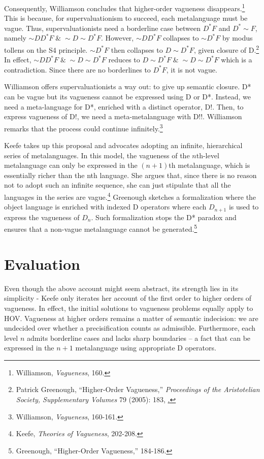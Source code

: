 Consequently, Williamson concludes that higher-order vagueness
disappears.\footnote{Williamson, \emph{Vagueness}, 160.} This is
because, for supervaluationism to succeed, each metalanguage must be
vague. Thus, supervaluationists need a borderline case between
$D^{*}F$ and $D^{*}{\sim}F$, namely
${{\sim}DD}^{*}F \; \& \; {\sim}D{\sim}D^{*}F$. However, ${{\sim}DD}^{*}F$
collapses to ${{\sim}D}^{*}F$ by modus tollens on the S4 principle. ${{\sim}D}^{*}F$ then collapses to ${D\sim D}^{*}F$, given closure of
D.\footnote{Patrick Greenough, ``Higher-Order Vagueness,''
  \emph{Proceedings of the Aristotelian Society, Supplementary Volumes}
  79 (2005): 183,
  \href{http://www.jstor.org/stable/4106939}.}
In effect, ${{\sim}DD}^{*}F \; \& \; {\sim}D{\sim}D^{*}F$ reduces to ${D{\sim}D}^{*}F \; \& \; {\sim}D{\sim}D^{*}F$ which is a contradiction.
Since there are no borderlines to $D^{*}F$, it is not vague.

Williamson offers supervaluationists a way out: to give up semantic
closure. D* can be vague but its vagueness cannot be expressed using D
or D*. Instead, we need a meta-language for D*, enriched with a distinct
operator, D!. Then, to express vagueness of D!, we need a
meta-metalanguage with D!!. Williamson remarks that the process could
continue infinitely.\footnote{Williamson, \emph{Vagueness}, 160-161.}

Keefe takes up this proposal and advocates adopting an infinite,
hierarchical series of metalanguages. In this model, the vagueness of
the $n$th-level metalanguage can only be expressed in the $(n+1)$th
metalanguage, which is essentially richer than the nth language. She
argues that, since there is no reason not to adopt such an infinite
sequence, she can just stipulate that all the languages in the series
are vague.\footnote{Keefe, \emph{Theories of Vagueness}, 202-208.}
Greenough sketches a formalization where the object language is enriched
with indexed D operators where each \(D_{n + 1}\) is used to express the
vagueness of \(D_{n}\). Such formalization stops the D* paradox and
ensures that a non-vague metalanguage cannot be generated.\footnote{Greenough,
  ``Higher-Order Vagueness,'' 184-186.}

\section{Evaluation}

Even though the above account might seem abstract, its strength lies in
its simplicity - Keefe only iterates her account of the first order to
higher orders of vagueness. In effect, the initial solutions to
vagueness problems equally apply to HOV. Vagueness at higher orders
remains a matter of semantic indecision: we are undecided over whether a
precisification counts as admissible. Furthermore, each level $n$
admits borderline cases and lacks sharp boundaries -- a fact that can be
expressed in the $n+1$ metalanguage using appropriate D operators.


